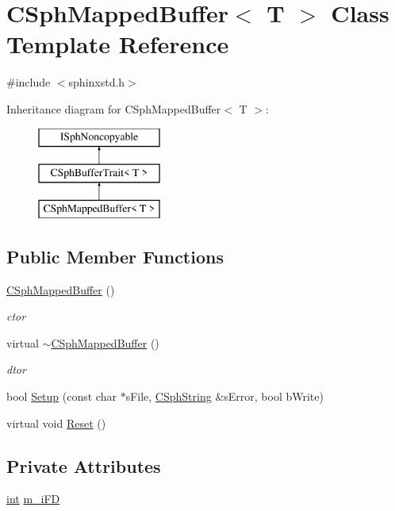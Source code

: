 \hypertarget{classCSphMappedBuffer}{\section{C\-Sph\-Mapped\-Buffer$<$ T $>$ Class Template Reference}
\label{classCSphMappedBuffer}
}


{\ttfamily \#include $<$sphinxstd.\-h$>$}

Inheritance diagram for C\-Sph\-Mapped\-Buffer$<$ T $>$\-:\begin{figure}[H]
\begin{center}
\leavevmode
\includegraphics[height=3.000000cm]{classCSphMappedBuffer}
\end{center}
\end{figure}
\subsection*{Public Member Functions}
\begin{DoxyCompactItemize}
\item 
\hyperlink{classCSphMappedBuffer_a57acfe63b12f41265dbe3e8e526905a3}{C\-Sph\-Mapped\-Buffer} ()
\begin{DoxyCompactList}\small\item\em ctor \end{DoxyCompactList}\item 
virtual \hyperlink{classCSphMappedBuffer_af6117b89fb79718e569aae8b865db876}{$\sim$\-C\-Sph\-Mapped\-Buffer} ()
\begin{DoxyCompactList}\small\item\em dtor \end{DoxyCompactList}\item 
bool \hyperlink{classCSphMappedBuffer_abd75a1d1ecae837392be3631dd57b2a2}{Setup} (const char $\ast$s\-File, \hyperlink{structCSphString}{C\-Sph\-String} \&s\-Error, bool b\-Write)
\item 
virtual void \hyperlink{classCSphMappedBuffer_a37fcc7d49b28fe4b5f22d3cd6222bf34}{Reset} ()
\end{DoxyCompactItemize}
\subsection*{Private Attributes}
\begin{DoxyCompactItemize}
\item 
\hyperlink{sphinxexpr_8cpp_a4a26e8f9cb8b736e0c4cbf4d16de985e}{int} \hyperlink{classCSphMappedBuffer_ac22fe77dc4c206306e2c31861f646fd6}{m\-\_\-i\-F\-D}
\end{DoxyCompactItemize}
